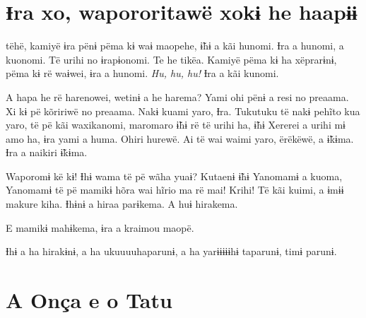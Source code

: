 

\chapter[Ɨra xo, wapororitawë xo kɨ he haapɨɨ]{Ɨra xo, wapororitawë xo\break kɨ he haapɨɨ}

 tëhë, kamiyë ɨra pënɨ pëma kɨ waɨ maopehe, ɨ̃hɨ a kãi hunomi. Ɨra a
hunomi, a kuonomi. Të urihi no ɨrapɨonomi. Te he tikëa. Kamiyë pëma kɨ
ha xëprarɨnɨ, pëma kɨ rë waɨwei, ɨra a hunomi. \textit{Hu, hu, hu!} Ɨra a kãi
kunomi. 

A hapa he rë harenowei, wetinɨ a he harema? Yami ohi pënɨ a resi no
preaama. Xi kɨ pë kõririwë no preaama. Nakɨ kuami yaro, Ɨra. Tukutuku të
nakɨ pehĩto kua yaro, të pë kãi waxikanomi, maromaro ɨ̃hɨ rë të urihi ha,
ɨ̃hɨ Xererei a urihi mɨ amo ha, ɨra yami a huma. Ohiri hurewë. Ai të wai
waimi yaro, ërëkëwë, a ɨ̃kɨma. Ɨra a naikiri ɨ̃kɨma. 


Waporomɨ kë kɨ! Ɨhɨ wama të pë wãha yuaɨ? Kutaenɨ ɨ̃hɨ Yanomamɨ a kuoma,
Yanomamɨ të pë mamikɨ hõra wai hĩrio ma rë mai! Krihi! Të kãi kuimi, a
ɨmɨɨ makure kiha. Ɨhɨnɨ a hiraa parɨkema. A huɨ hirakema. 

E mamikɨ mahɨkema, ɨra a kraimou maopë. 

Ɨhɨ a ha hirakɨnɨ, a ha ukuuuuhaparunɨ, a ha yarɨɨɨɨɨhɨ taparunɨ, timɨ
parunɨ. 

\chapter{A Onça e o Tatu}
 

